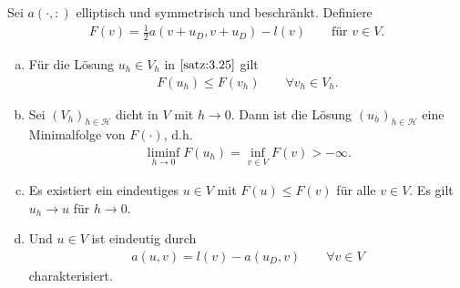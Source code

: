 \begin{Satz}
    \label{satz:3.26}
    Sei $a(\cdot, :)$ elliptisch und symmetrisch und beschränkt. Definiere
    \begin{eqnarray*}
        F(v) = \frac{1}{2} a(v + u_D, v + u_D) - l(v) \qquad \text{für } v \in V.
    \end{eqnarray*}
    \begin{enumerate}[a)]
      \item
        Für die Lösung $u_h\in V_h$ in $\eqref{satz:3.25}$ gilt
        \begin{eqnarray*}
            F(u_h) \le F(v_h) \qquad \forall v_h\in V_h.
        \end{eqnarray*}
      \item
        Sei $(V_h)_{h\in\mathcal{H}}$ dicht in $V$ mit $h \to 0$. Dann ist die
        Lösung $(u_h)_{h\in\mathcal{H}}$ eine Minimalfolge von $F(\cdot)$,
        d.h.
        \begin{eqnarray*}
            \liminf_{h\to0} F(u_h) = \inf_{v\in V} F(v) > - \infty.
        \end{eqnarray*}
      \item
        Es existiert ein eindeutiges $u\in V$ mit $F(u) \le F(v)$ für alle
        $v\in V$. Es gilt $u_h \to u$ für $h \to 0$.
      \item
        Und $u\in V$ ist eindeutig durch
        \begin{eqnarray*}
            a(u, v) = l(v) - a(u_D, v) \qquad \forall v\in V
        \end{eqnarray*}
        charakterisiert.
    \end{enumerate}
\end{Satz}


